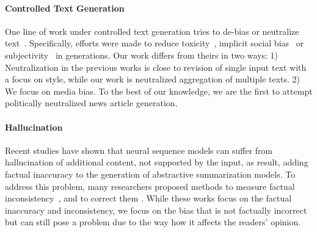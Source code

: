 \documentclass[11pt,a4paper]{article}
\begin{document}
\paragraph{Controlled Text Generation}
One line of work under controlled text generation tries to de-bias or neutralize text~\cite{dathathri2019plug, pryzant2020automatically, ma2020powertransformer}. Specifically, efforts were made to reduce toxicity~\cite{dathathri2019plug}, implicit social bias~\cite{ma2020powertransformer} or subjectivity~\cite{pryzant2020automatically} in generations.
Our work differs from theirs in two ways: 1) Neutralization in the previous works is close to revision of single input text with a focus on style, while our work is neutralized aggregation of multiple texts. 2) We focus on media bias. To the best of our knowledge, we are the first to attempt politically neutralized news article generation.

\paragraph{Hallucination} 
Recent studies have shown that neural sequence models can suffer from hallucination of additional content, not supported by the input, as result, adding factual inaccuracy to the generation of abstractive summarization models. To address this problem, many researchers proposed methods to measure factual inconsistency~\cite{holtzman2019curious, kryscinski2019evaluating, zhou2020detecting, lux2020truth, gabriel2020go}, and to correct them \cite{zhao2020reducing, cao2020factual, dong2020multi}. While these works focus on the factual inaccuracy and inconsistency, we focus on the bias that is not factually incorrect but can still pose a problem due to the way how it affects the readers' opinion.
\end{document}
